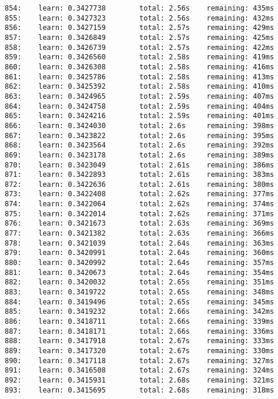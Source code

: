\documentclass[11pt]{article}
\begin{document}
\begin{Verbatim}[commandchars=\\\{\}]
854:    learn: 0.3427738        total: 2.56s    remaining: 435ms
855:    learn: 0.3427323        total: 2.56s    remaining: 432ms
856:    learn: 0.3427159        total: 2.57s    remaining: 429ms
857:    learn: 0.3426849        total: 2.57s    remaining: 425ms
858:    learn: 0.3426739        total: 2.57s    remaining: 422ms
859:    learn: 0.3426560        total: 2.58s    remaining: 419ms
860:    learn: 0.3426308        total: 2.58s    remaining: 416ms
861:    learn: 0.3425786        total: 2.58s    remaining: 413ms
862:    learn: 0.3425392        total: 2.58s    remaining: 410ms
863:    learn: 0.3424965        total: 2.59s    remaining: 407ms
864:    learn: 0.3424758        total: 2.59s    remaining: 404ms
865:    learn: 0.3424216        total: 2.59s    remaining: 401ms
866:    learn: 0.3424030        total: 2.6s     remaining: 398ms
867:    learn: 0.3423822        total: 2.6s     remaining: 395ms
868:    learn: 0.3423564        total: 2.6s     remaining: 392ms
869:    learn: 0.3423178        total: 2.6s     remaining: 389ms
870:    learn: 0.3423049        total: 2.61s    remaining: 386ms
871:    learn: 0.3422893        total: 2.61s    remaining: 383ms
872:    learn: 0.3422636        total: 2.61s    remaining: 380ms
873:    learn: 0.3422408        total: 2.62s    remaining: 377ms
874:    learn: 0.3422064        total: 2.62s    remaining: 374ms
875:    learn: 0.3422014        total: 2.62s    remaining: 371ms
876:    learn: 0.3421673        total: 2.63s    remaining: 369ms
877:    learn: 0.3421382        total: 2.63s    remaining: 366ms
878:    learn: 0.3421039        total: 2.64s    remaining: 363ms
879:    learn: 0.3420991        total: 2.64s    remaining: 360ms
880:    learn: 0.3420992        total: 2.64s    remaining: 357ms
881:    learn: 0.3420673        total: 2.64s    remaining: 354ms
882:    learn: 0.3420032        total: 2.65s    remaining: 351ms
883:    learn: 0.3419722        total: 2.65s    remaining: 348ms
884:    learn: 0.3419496        total: 2.65s    remaining: 345ms
885:    learn: 0.3419232        total: 2.66s    remaining: 342ms
886:    learn: 0.3418711        total: 2.66s    remaining: 339ms
887:    learn: 0.3418171        total: 2.66s    remaining: 336ms
888:    learn: 0.3417918        total: 2.67s    remaining: 333ms
889:    learn: 0.3417320        total: 2.67s    remaining: 330ms
890:    learn: 0.3417118        total: 2.67s    remaining: 327ms
891:    learn: 0.3416508        total: 2.67s    remaining: 324ms
892:    learn: 0.3415931        total: 2.68s    remaining: 321ms
893:    learn: 0.3415695        total: 2.68s    remaining: 318ms

\end{Verbatim}
\end{document}
